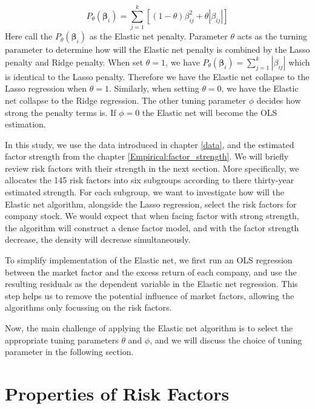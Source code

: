 \[	P_{\theta}(\bm{\beta}_i) =\sum_{j=1}^k [ (1-\theta)\beta_{ij}^2 + \theta |\beta_{ij}|] \label{EN:elastic_net_penalty} \tag{13}\]
Here \citeauthor{Zou2005} call the $P_{\theta}(\bm{\beta}_{i})$ as the Elastic net penalty.
Parameter $\theta$ acts as the turning parameter to determine how will the Elastic net penalty is combined by the Lasso penalty and Ridge penalty.
When set $\theta = 1$, we have $P_{\theta}(\bm{\beta}_i) =\sum_{j=1}^k  |\beta_{ij}|$ which is identical to the Lasso penalty.
Therefore we have the Elastic net collapse to the Lasso regression when $\theta = 1$.
Similarly, when setting $\theta = 0$, we have the Elastic net collapse to the Ridge regression. 
The other tuning parameter $\phi$ decides how strong the penalty terms is.
If $\phi = 0$ the Elastic net will become the OLS estimation.

In this study, we use the data introduced in chapter \ref{data}, and the estimated factor strength from the chapter \ref{Empirical:factor_strength}.
We will briefly review risk factors with their strength in the next section.
More specifically, we allocates the 145 risk factors into six subgroups according to there thirty-year estimated strength.
For each subgroup, we want to investigate how will the Elastic net algorithm, alongside the Lasso regression, select the risk factors for company stock.
We would expect that when facing factor with strong strength, the algorithm will construct a dense factor model, and with the factor strength decrease, the density will decrease simultaneously.

To simplify implementation of the Elastic net, we first run an OLS regression between the market factor and the excess return of each company, and use the resulting residuals as the dependent variable in the Elastic net regression.
This step helps us to remove the potential influence of market factors, allowing the algorithms only focussing on the risk factors. 

Now, the main challenge of applying the Elastic net algorithm is to select the appropriate tuning parameters $\theta$ and $\phi$, and we will discuss the choice of tuning parameter in the following section.

\section{Properties of Risk Factors} \label{EN:risk_factor}

